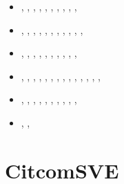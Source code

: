 \begin{small}
\begin{itemize}
\item[\twothousandtwenty]    \textcite{weki20},  \textcite{braf20},  \textcite{pagh20},
                             \textcite{vamg20},  \textcite{heyg20},  \textcite{loru20}, 
                             \textcite{bill20},  \textcite{sele20},
                             \textcite{dazl20},  \textcite{wali20}, 
\item[\twothousandtwentyone] \textcite{cafm21},  \textcite{ligl21},  \textcite{lule21},
                             \textcite{scvg21},  \textcite{ligl21b}, \textcite{maba21},
                             \textcite{wali21},  \textcite{cafb21},  \textcite{mazh21a}
                             \textcite{hulg21},  \textcite{moma21},  \textcite{sabp21},
                             \textcite{mazh21b}
\item[\twothousandtwentytwo] \textcite{limc22},  \textcite{scva22},  \textcite{yuli22},
                             \textcite{flbw22},  \textcite{kibm22},  \textcite{rojy22},
                             \textcite{ghpa22},  \textcite{maba22},  \textcite{peli22},
                             \textcite{fube22},  \textcite{wuwh22}
\item[\twothousandtwentythree] \textcite{li__23}, \textcite{lilz23}, \textcite{bofl23},
                               \textcite{hagl23}, \textcite{wacp23}, \textcite{lilw23},
                               \textcite{zhzl23}, \textcite{li__23}, \textcite{befu23},
                               \textcite{pacb23}, \textcite{tumk23}, \textcite{zhle23},
                               \textcite{peli23}, \textcite{pagh23}, \textcite{yuld23}
\item[\twothousandtwentyfour]  \textcite{bero24}, \textcite{lobb24}, \textcite{muki24},
                               \textcite{wefl24}, \textcite{sawb24}, \textcite{docl24},
                               \textcite{lizm24}, \textcite{pest24}, \textcite{haym24},
                               \textcite{xihw24}, \textcite{liwg24}
\item[\twothousandtwentyfive]  \textcite{bhjk25}, \textcite{weki25}, \textcite{yawz25}
\end{itemize}
\end{small}


\section{CitcomSVE} 

